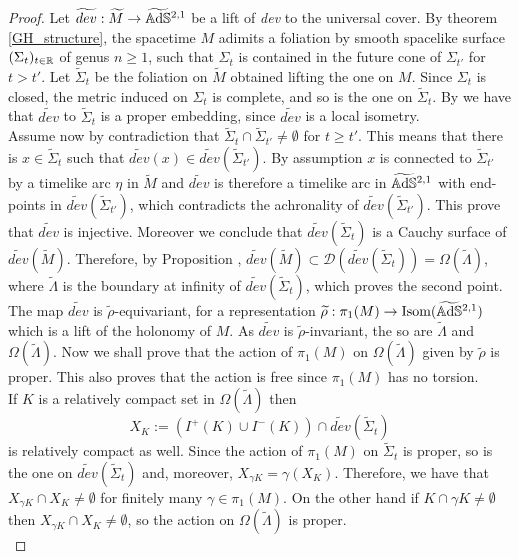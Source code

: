 \begin{proof}
    Let $\widetilde{dev}: \widetilde{M} \to \widetilde{\mathbb{A}\mathrm{d}\mathbb{S}}{}^{2,1}$ be a lift of \textit{dev} to the universal cover. By theorem \ref{GH_structure}, the spacetime $M$ adimits a foliation by smooth spacelike surface $(\Sigma_t)_{t\in\mathbb{R}}$ of genus $n\geq 1$, such that $\Sigma_t$ is contained in the future cone of $\Sigma_{t'}$ for $t > t'$. Let $\widetilde{\Sigma}_t$ be the foliation on $\widetilde{M}$ obtained lifting the one on $M$. Since $\Sigma_t$ is closed, the metric induced on $\Sigma_t$ is complete, and so is the one on $\widetilde{\Sigma}_t$. By  we have that $\widetilde{dev}$ to $\widetilde{\Sigma}_t$ is a proper embedding, since $\widetilde{dev}$ is a local isometry.\\
    Assume now by contradiction that $\widetilde{\Sigma}_t \cap \widetilde{\Sigma}_{t'} \neq \emptyset$ for $t \geq t'$. This means that there is $x \in \widetilde{\Sigma}_t$ such that $\widetilde{dev}(x) \in \widetilde{dev}(\widetilde{\Sigma}_{t'})$. By assumption $x$ is connected to $\widetilde{\Sigma}_{t'}$ by a timelike arc $\eta$ in $\widetilde{M}$ and $\widetilde{dev}$ is therefore a timelike arc in $\widetilde{\mathbb{A}\mathrm{d}\mathbb{S}}{}^{2,1}$ with end-points in $\widetilde{dev}(\widetilde{\Sigma}_{t'})$, which contradicts the achronality of $\widetilde{dev}(\widetilde{\Sigma}_{t'})$. This prove that $\widetilde{dev}$ is injective. Moreover we conclude that $\widetilde{dev}(\widetilde{\Sigma}_t)$ is a Cauchy surface of $\widetilde{dev}(\widetilde{M})$. Therefore, by Proposition , $\widetilde{dev}(\widetilde{M}) \subset \mathcal{D}(\widetilde{dev}(\widetilde{\Sigma}_t)) = \Omega(\widetilde{\Lambda})$, where $\widetilde{\Lambda}$ is the boundary at infinity of $\widetilde{dev}(\widetilde{\Sigma}_t)$, which proves the second point.\\
    The map $\widetilde{dev}$ is $\widetilde{\rho}$-equivariant, for a representation $\widetilde{\rho} : \pi_1(M) \to \text{Isom}(\widetilde{\mathbb{A}\mathrm{d}\mathbb{S}}{}^{2,1})$ which is a lift of the holonomy of $M$. As $\widetilde{dev}$ is $\widetilde{\rho}$-invariant, the so are $\widetilde{\Lambda}$ and $\Omega(\widetilde{\Lambda})$. Now we shall prove that the action of $\pi_1(M)$ on $\Omega(\widetilde{\Lambda})$ given by $\widetilde{\rho}$ is proper. This also proves that the action is free since $\pi_1(M)$ has no torsion.\\
    If $K$ is a relatively compact set in $\Omega(\widetilde{\Lambda})$ then
    \[
        X_K := (I^+(K) \cup I^-(K)) \cap \widetilde{dev}(\widetilde{\Sigma}_t)
    \]
    is relatively compact as well. Since the action of $\pi_1(M)$ on $\widetilde{\Sigma}_t$ is proper, so is the one on $\widetilde{dev}(\widetilde{\Sigma}_t)$ and, moreover, $X_{\gamma K} = \gamma(X_K)$. Therefore, we have that $X_{\gamma K} \cap X_K \neq \emptyset$ for finitely many $\gamma \in \pi_1(M)$. On the other hand if $K \cap \gamma K \neq \emptyset$ then $X_{\gamma K} \cap X_K \neq \emptyset$, so the action on $\Omega(\widetilde{\Lambda})$ is proper.\\

\end{proof}
